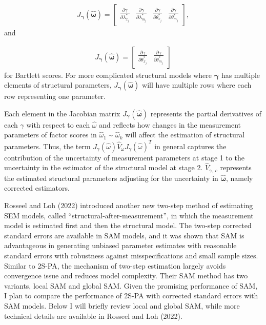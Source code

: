 \documentclass[
  man]{apa6}
\begin{document}
\begin{align}
J_{\boldsymbol{\gamma}}(\boldsymbol{\hat{\omega}}) = 
\begin{bmatrix}
\frac{\partial \gamma}{\partial \lambda_{x_{j}}^*} & \frac{\partial \gamma}{\partial \lambda_{m_{j}}^*} & \frac{\partial \gamma}{\partial \theta_{x_{j}}^*} & \frac{\partial \gamma}{\partial \theta_{m_{j}}^*}
\end{bmatrix},
\end{align}
and

\begin{align}
J_{\boldsymbol{\gamma}}(\boldsymbol{\hat{\omega}}) = 
\begin{bmatrix}
\frac{\partial \gamma}{\partial \theta_{x_{j}}^*} & \frac{\partial \gamma}{\partial \theta_{m_{j}}^*}
\end{bmatrix}
\end{align}
for Bartlett scores. For more complicated structural models where \(\boldsymbol{\gamma}\) has multiple elements of structural parameters, \(J_{\boldsymbol{\gamma}}(\boldsymbol{\hat{\omega}})\) will have multiple rows where each row representing one parameter.

Each element in the Jacobian matrix \(J_{\boldsymbol{\gamma}}(\boldsymbol{\hat{\omega}})\) represents the partial derivatives of each \(\gamma\) with respect to each \(\hat{\omega}\) and reflects how changes in the measurement parameters of factor scores in \(\hat{\omega}_{1}\) \textasciitilde{} \(\hat{\omega}_{k}\) will affect the estimation of structural parameters. Thus, the term \(J_{\gamma}(\hat{\omega}) \hat{V}_{\omega} J_{\gamma}(\hat{\omega})^T\) in general captures the contribution of the uncertainty of measurement parameters at stage 1 to the uncertainty in the estimator of the structural model at stage 2. \(\hat{V}_{\gamma,\ c}\) represents the estimated structural parameters adjusting for the uncertainty in \(\boldsymbol{\hat{\omega}}\), namely corrected estimators.

Rosseel and Loh (2022) introduced another new two-step method of estimating SEM models, called ``structural-after-measurement'', in which the measurement model is estimated first and then the structural model. The two-step corrected standard errors are available in SAM models, and it was shown that SAM is advantageous in generating unbiased parameter estimates with reasonable standard errors with robustness against misspecifications and small sample sizes. Similar to 2S-PA, the mechanism of two-step estimation largely avoids convergence issue and reduces model complexity. Their SAM method has two variants, local SAM and global SAM. Given the promising performance of SAM, I plan to compare the performance of 2S-PA with corrected standard errors with SAM models. Below I will briefly review local and global SAM, while more technical details are available in Rosseel and Loh (2022).
\end{document}
